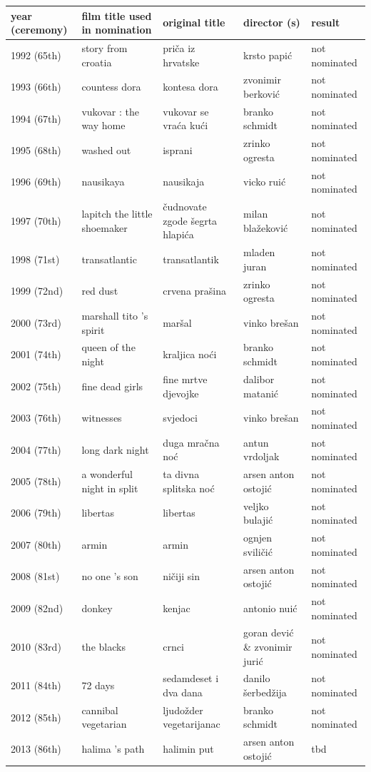 \documentclass{article}
\begin{document}
\begin{tabular}{lllll}
\toprule
year (ceremony) & film title used in nomination & original title & director (s) & result \\
\midrule
1992 (65th) & story from croatia & priča iz hrvatske & krsto papić & not nominated \\
1993 (66th) & countess dora & kontesa dora & zvonimir berković & not nominated \\
1994 (67th) & vukovar : the way home & vukovar se vraća kući & branko schmidt & not nominated \\
1995 (68th) & washed out & isprani & zrinko ogresta & not nominated \\
1996 (69th) & nausikaya & nausikaja & vicko ruić & not nominated \\
1997 (70th) & lapitch the little shoemaker & čudnovate zgode šegrta hlapića & milan blažeković & not nominated \\
1998 (71st) & transatlantic & transatlantik & mladen juran & not nominated \\
1999 (72nd) & red dust & crvena prašina & zrinko ogresta & not nominated \\
2000 (73rd) & marshall tito 's spirit & maršal & vinko brešan & not nominated \\
2001 (74th) & queen of the night & kraljica noći & branko schmidt & not nominated \\
2002 (75th) & fine dead girls & fine mrtve djevojke & dalibor matanić & not nominated \\
2003 (76th) & witnesses & svjedoci & vinko brešan & not nominated \\
2004 (77th) & long dark night & duga mračna noć & antun vrdoljak & not nominated \\
2005 (78th) & a wonderful night in split & ta divna splitska noć & arsen anton ostojić & not nominated \\
2006 (79th) & libertas & libertas & veljko bulajić & not nominated \\
2007 (80th) & armin & armin & ognjen sviličić & not nominated \\
2008 (81st) & no one 's son & ničiji sin & arsen anton ostojić & not nominated \\
2009 (82nd) & donkey & kenjac & antonio nuić & not nominated \\
2010 (83rd) & the blacks & crnci & goran dević \& zvonimir jurić & not nominated \\
2011 (84th) & 72 days & sedamdeset i dva dana & danilo šerbedžija & not nominated \\
2012 (85th) & cannibal vegetarian & ljudožder vegetarijanac & branko schmidt & not nominated \\
2013 (86th) & halima 's path & halimin put & arsen anton ostojić & tbd \\
\bottomrule
\end{tabular}
\end{document}
